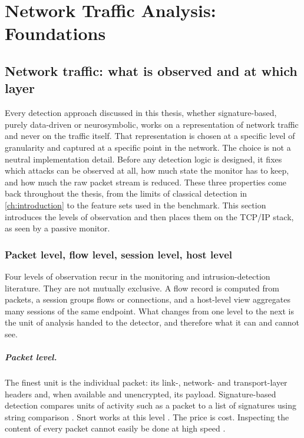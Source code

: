 \chapter{Network Traffic Analysis: Foundations}
\label{ch:foundations}

\section{Network traffic: what is observed and at which layer}
\label{sec:network-observation-levels}

Every detection approach discussed in this thesis, whether signature-based,
purely data-driven or neurosymbolic, works on a representation of network
traffic and never on the traffic itself. That representation is chosen at a
specific level of granularity and captured at a specific point in the
network. The choice is not a neutral implementation detail. Before any
detection logic is designed, it fixes which attacks can be observed at all,
how much state the monitor has to keep, and how much the raw packet stream
is reduced. These three properties come back throughout the thesis, from the
limits of classical detection in \cref{ch:introduction} to the feature sets
used in the benchmark. This section introduces the levels of observation and
then places them on the TCP/IP stack, as seen by a passive monitor.

\subsection{Packet level, flow level, session level, host level}
\label{sec:levels-packet-flow-session-host}

Four levels of observation recur in the monitoring and intrusion-detection
literature. They are not mutually exclusive. A flow record is computed from
packets, a session groups flows or connections, and a host-level view
aggregates many sessions of the same endpoint. What changes from one level
to the next is the unit of analysis handed to the detector, and therefore
what it can and cannot see.

\paragraph{Packet level.}
The finest unit is the individual packet: its link-, network- and
transport-layer headers and, when available and unencrypted, its payload.
Signature-based detection compares units of activity such as a packet to a
list of signatures using string comparison \citep{scarfone2007nist80094}.
Snort works at this level \citep{roesch1999snort}. The price is cost.
Inspecting the content of every packet cannot easily be done at high speed
\citep{sperotto2010flowbased}.

